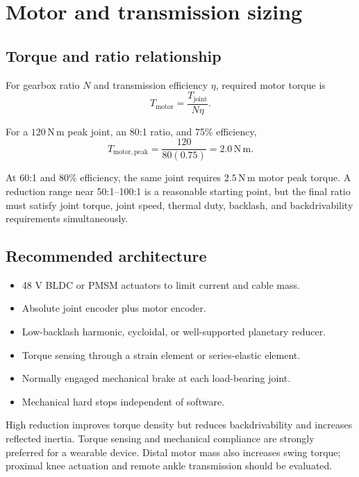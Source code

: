\documentclass[11pt,a4paper]{article}
\newcommand{\unit}[1]{\ensuremath{\,\mathrm{#1}}}
\newcommand{\Nm}{\unit{N\,m}}
\begin{document}
\section{Motor and transmission sizing}

\subsection{Torque and ratio relationship}

For gearbox ratio $N$ and transmission efficiency $\eta$, required motor torque is
\begin{equation}
  T_{\mathrm{motor}}=\frac{T_{\mathrm{joint}}}{N\eta}.
\end{equation}

For a $120\Nm$ peak joint, an 80:1 ratio, and 75\% efficiency,
\begin{equation}
  T_{\mathrm{motor,peak}}
  =\frac{120}{80(0.75)}
  =\boxed{2.0\Nm}.
\end{equation}

At 60:1 and 80\% efficiency, the same joint requires $2.5\Nm$ motor peak torque. A reduction range near 50:1--100:1 is a reasonable starting point, but the final ratio must satisfy joint torque, joint speed, thermal duty, backlash, and backdrivability requirements simultaneously.

\subsection{Recommended architecture}

\begin{itemize}
  \item 48 V BLDC or PMSM actuators to limit current and cable mass.
  \item Absolute joint encoder plus motor encoder.
  \item Low-backlash harmonic, cycloidal, or well-supported planetary reducer.
  \item Torque sensing through a strain element or series-elastic element.
  \item Normally engaged mechanical brake at each load-bearing joint.
  \item Mechanical hard stops independent of software.
\end{itemize}

High reduction improves torque density but reduces backdrivability and increases reflected inertia. Torque sensing and mechanical compliance are strongly preferred for a wearable device. Distal motor mass also increases swing torque; proximal knee actuation and remote ankle transmission should be evaluated.
\end{document}
